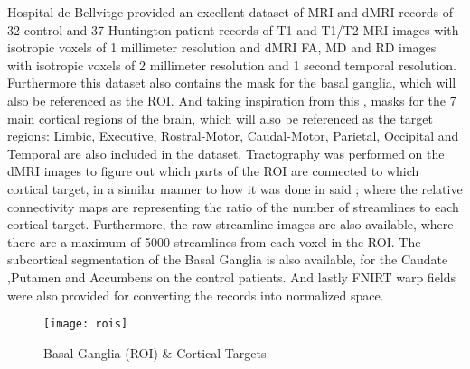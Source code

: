  \par

Hospital de Bellvitge provided an excellent dataset of \ac{MRI} and \ac{dMRI} records of 32 control and 37 Huntington patient records of T1 and T1/T2 \ac{MRI} images with isotropic voxels of 1 millimeter resolution and \ac{dMRI} \ac{FA}, \ac{MD} and \ac{RD} images with isotropic voxels of 2 millimeter resolution and 1 second temporal resolution. Furthermore this dataset also contains the mask for the basal ganglia, which will also be referenced as the \ac{ROI}. And taking inspiration from this , masks for the 7 main cortical regions of the brain, which will also be referenced as the target regions: Limbic, Executive, Rostral-Motor, Caudal-Motor, Parietal, Occipital and Temporal are also included in the dataset. Tractography was performed on the \ac{dMRI} images to figure out which parts of the \ac{ROI} are connected to which cortical target, in a similar manner to how it was done in said ; where the relative connectivity maps are representing the ratio of the number of streamlines to each cortical target. Furthermore, the raw streamline images are also available, where there are a maximum of 5000 streamlines from each voxel in the \ac{ROI}. The subcortical segmentation of the Basal Ganglia is also available, for the Caudate ,Putamen and Accumbens on the control patients. And lastly \ac{FNIRT} warp fields were also provided for converting the records into normalized space.\par

\begin{figure}[H]
\centering
\texttt{[image: rois]}
\caption{Basal Ganglia (ROI) \& Cortical Targets}
\label{fig:rois}
\end{figure}

